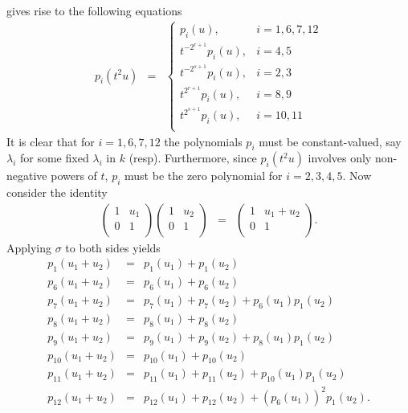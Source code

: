  gives rise to the following equations
 \begin{eqnarray}
 \label{tAct}
 p_i(t^2u) &=& \left\{    \begin{array}{ll}
       p_i(u), & i = 1,6,7,12 \\
       t^{-2^{r+1}}p_i(u), & i = 4,5 \\
       t^{-2^{s+1}}p_i(u), & i = 2,3 \\
       t^{2^{r+1}}p_i(u), & i = 8,9 \\
       t^{2^{s+1}}p_i(u), & i = 10,11 \\
    \end{array}
 \right.
 \end{eqnarray}
It is clear that for $i = 1,6,7,12$ the polynomials $p_i$ must be constant-valued, say $\lambda_i$ for some fixed $\lambda_i$ in $k$ (resp). Furthermore, since $p_i(t^2u)$ involves only non-negative powers of $t$, $p_i$ must be the zero polynomial for $i=2,3,4,5$. Now consider the identity
\begin{eqnarray*}
  \left( \begin{matrix}
      1 & u_1 \\
      0 & 1 \\
   \end{matrix}\right)
   \left(\begin{matrix}
      1 & u_2 \\
      0 & 1 \\
   \end{matrix}\right) &=&
    \left(\begin{matrix}
      1 & u_1 + u_2 \\
      0 & 1 \\
   \end{matrix}\right).
\end{eqnarray*}
Applying $\sigma$ to both sides yields
\begin{eqnarray*}
p_1(u_1 + u_2) &=& p_1(u_1) + p_1(u_2) \\
p_6(u_1 + u_2) &=& p_6(u_1) + p_6(u_2) \\
p_7(u_1 + u_2) &=& p_7(u_1) + p_7(u_2) + p_6(u_1)p_1(u_2)\\
p_8(u_1 + u_2) &=& p_8(u_1) + p_8(u_2) \\
p_9(u_1 + u_2) &=& p_9(u_1) + p_9(u_2) + p_8(u_1)p_1(u_2)\\
p_{10}(u_1 + u_2) &=& p_{10}(u_1) + p_{10}(u_2)\\
p_{11}(u_1 + u_2) &=& p_{11}(u_1) + p_{11}(u_2) + p_{10}(u_1)p_1(u_2)\\
p_{12}(u_1 + u_2) &=& p_{12}(u_1) + p_{12}(u_2) + \left(p_6(u_1)\right)^2p_1(u_2).
\end{eqnarray*}
